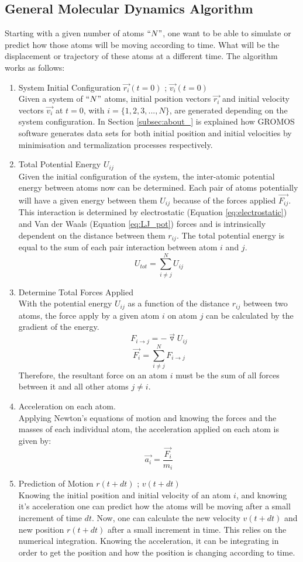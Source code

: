 \subsection{General Molecular Dynamics Algorithm}

Starting with a given number of atoms $``N"$, one want to be able to simulate or predict how those atoms will be moving according to time. What will be the displacement or trajectory of these atoms at a different time. The algorithm works as follows:
\begin{enumerate}
    \item System Initial Configuration $\vec{r_{i}}(t=0)$ ; $\vec{v_{i}}(t=0)$\\
    Given a system of $``N"$ atoms, initial position vectors $\vec{r_i}$ and initial velocity vectors $\vec{v_i}$ at $t=0$, with $i=\{1,2,3,...,N\}$, are generated depending on the system configuration. In Section  \ref{subsec:about_} is explained how GROMOS software generates data sets for both initial position and initial velocities by minimisation and termalization processes respectively.
    \item Total Potential Energy $U_{ij}$ \\
    Given the initial configuration of the system, the inter-atomic potential energy between atoms now can be determined. Each pair of atoms potentially will have a given energy between them $U_{ij}$ because of the forces applied $\vec{F_{ij}}$. This interaction is determined by electrostatic (Equation \ref{eq:electrostatic}) and Van der Waals (Equation \ref{eq:LJ_pot}) forces and is intrinsically dependent on the distance between them $r_{ij}$. The total potential energy is equal to the sum of each pair interaction between atom $i$ and $j$.
    $$U_{tot}=\sum_{i\neq j}^N U_{ij}$$
    \item Determine Total Forces Applied\\
    With the potential energy $U_{ij}$ as a function of the distance $r_{ij}$ between two atoms, the force apply by a given atom $i$ on atom $j$ can be calculated by the gradient of the energy.
    $$ F_{i\rightarrow j}=-\vec{\triangledown } U_{ij}$$
    $$ \vec{F_i} = \sum_{i\neq j}^N F_{i\rightarrow j}$$
    Therefore, the resultant force on an atom $i$ must be the sum of all forces between it and all other atoms $j\neq i$. 
    \item Acceleration on each atom.\\
    Applying Newton's equations of motion and knowing the forces and the masses of each individual atom,  the acceleration applied on each atom is given by:
    $$\vec{a_i}=\frac{\vec{F_i}}{m_i}$$
    \item Prediction of Motion $r(t+dt)$ ; $v(t+dt)$\\
    Knowing the initial position and initial velocity of an atom $i$, and knowing it's acceleration one can predict how the atoms will be moving after a small increment of time $dt$. Now, one can calculate the new velocity $v(t+dt)$ and new position $r(t+dt)$ after a small increment in time. This relies on the numerical integration. Knowing the acceleration, it can be integrating in order to get the position and how the position is changing according to time. 
\end{enumerate}

